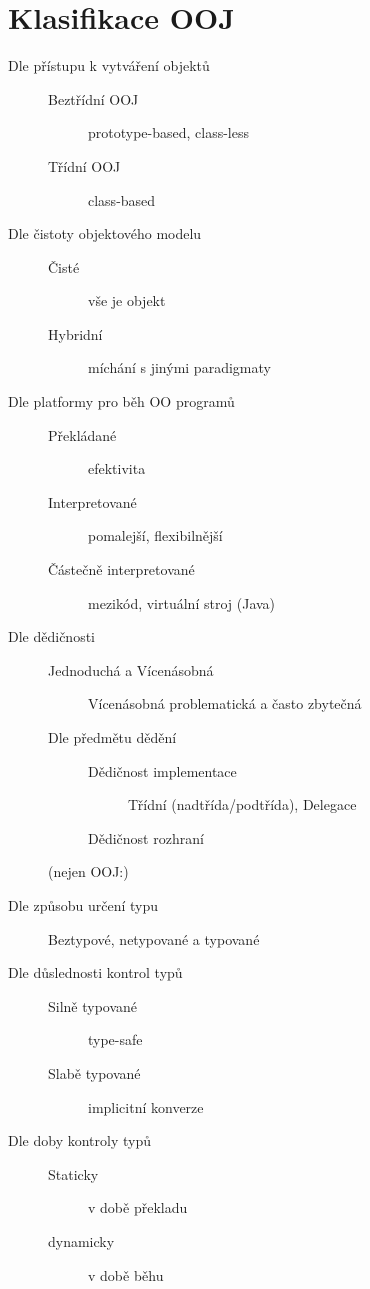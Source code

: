 \documentclass[a4wide]{report}
\begin{document}
\section{Klasifikace OOJ}
\begin{description}
	\item[Dle přístupu k vytváření objektů] \hfill
	\begin{description}
		\item[Beztřídní OOJ] prototype-based, class-less
		\item[Třídní OOJ] class-based
	\end{description}
	\item[Dle čistoty objektového modelu] \hfill
	\begin{description}
		\item[Čisté] vše je objekt
		\item[Hybridní] míchání s jinými paradigmaty
	\end{description}
	\item[Dle platformy pro běh OO programů] \hfill
	\begin{description}
		\item[Překládané] efektivita
		\item[Interpretované] pomalejší, flexibilnější
		\item[Částečně interpretované] mezikód, virtuální stroj (Java)
	\end{description}
	\item[Dle dědičnosti] \hfill
	\begin{description}
		\item[Jednoduchá a Vícenásobná] Vícenásobná problematická a často zbytečná
		\item[Dle předmětu dědění] \hfill
		\begin{description}
			\item[Dědičnost implementace] Třídní (nadtřída/podtřída), Delegace
			\item[Dědičnost rozhraní]
		\end{description}
	\end{description}
	(nejen OOJ:)
	\item[Dle způsobu určení typu] Beztypové, netypované a typované
	\item[Dle důslednosti kontrol typů] \hfill
	\begin{description}
		\item[Silně typované] type-safe
		\item[Slabě typované] implicitní konverze
	\end{description}
	\item[Dle doby kontroly typů] \hfill
	\begin{description}
		\item[Staticky] v době překladu
		\item[dynamicky] v době běhu
	\end{description}
	
	
\end{description}
\end{document}
